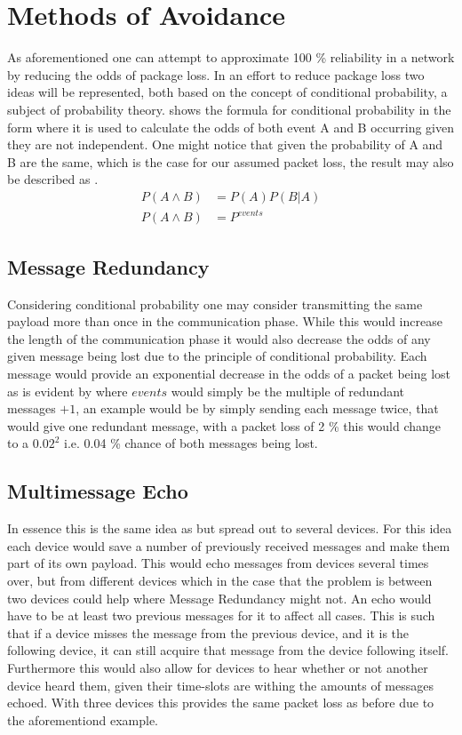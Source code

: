 \section{Methods of Avoidance}
As aforementioned one can attempt to approximate 100 \% reliability in a network by reducing the odds of package loss.
In an effort to reduce package loss two ideas will be represented, both based on the concept of conditional probability, a subject of probability theory.
 shows the formula for conditional probability in the form where it is used to calculate the odds of both event A and B occurring given they are not independent.
One might notice that given the probability of A and B are the same, which is the case for our assumed packet loss, the result may also be described as .
\begin{align}
P(A \land B) &= P(A)P(B|A) \label{eq:conditionalProb} \\  
P(A \land B) &= P^{events} \label{eq:conditionalProb2}
\end{align}

\subsection{Message Redundancy}\label{redundancy}
Considering conditional probability one may consider transmitting the same payload more than once in the communication phase.
While this would increase the length of the communication phase it would also decrease the odds of any given message being lost due to the principle of conditional probability.
Each message would provide an exponential decrease in the odds of a packet being lost as is evident by  where $events$ would simply be the multiple of redundant messages $+ 1$, an example would be by simply sending each message twice, that would give one redundant message, with a packet loss of 2 \% this would change to a $0.02^2$ i.e. 0.04 \% chance of both messages being lost.

\subsection{Multimessage Echo}
In essence this is the same idea as  but spread out to several devices.
For this idea each device would save a number of previously received messages and make them part of its own payload.
This would echo messages from devices several times over, but from different devices which in the case that the problem is between two devices could help where Message Redundancy might not.
An echo would have to be at least two previous messages for it to affect all cases.
This is such that if a device misses the message from the previous device, and it is the following device, it can still acquire that message from the device following itself.
Furthermore this would also allow for devices to hear whether or not another device heard them, given their time-slots are withing the amounts of messages echoed.
With three devices this provides the same packet loss as before due to the aforementiond example.

